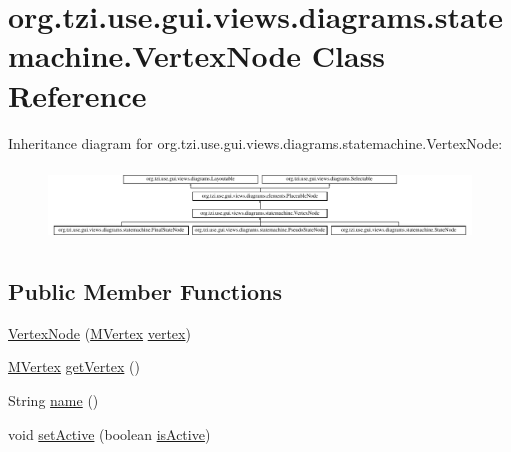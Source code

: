\hypertarget{classorg_1_1tzi_1_1use_1_1gui_1_1views_1_1diagrams_1_1statemachine_1_1_vertex_node}{\section{org.\-tzi.\-use.\-gui.\-views.\-diagrams.\-statemachine.\-Vertex\-Node Class Reference}
\label{classorg_1_1tzi_1_1use_1_1gui_1_1views_1_1diagrams_1_1statemachine_1_1_vertex_node}
}
Inheritance diagram for org.\-tzi.\-use.\-gui.\-views.\-diagrams.\-statemachine.\-Vertex\-Node\-:\begin{figure}[H]
\begin{center}
\leavevmode
\includegraphics[height=2.007169cm]{classorg_1_1tzi_1_1use_1_1gui_1_1views_1_1diagrams_1_1statemachine_1_1_vertex_node}
\end{center}
\end{figure}
\subsection*{Public Member Functions}
\begin{DoxyCompactItemize}
\item 
\hyperlink{classorg_1_1tzi_1_1use_1_1gui_1_1views_1_1diagrams_1_1statemachine_1_1_vertex_node_a2e0d79f06a37c970dd05ab9fc585c262}{Vertex\-Node} (\hyperlink{classorg_1_1tzi_1_1use_1_1uml_1_1mm_1_1statemachines_1_1_m_vertex}{M\-Vertex} \hyperlink{classorg_1_1tzi_1_1use_1_1gui_1_1views_1_1diagrams_1_1statemachine_1_1_vertex_node_a9475b226ad0fa74ddbbc6217874a867e}{vertex})
\item 
\hyperlink{classorg_1_1tzi_1_1use_1_1uml_1_1mm_1_1statemachines_1_1_m_vertex}{M\-Vertex} \hyperlink{classorg_1_1tzi_1_1use_1_1gui_1_1views_1_1diagrams_1_1statemachine_1_1_vertex_node_ae0b110dc35b4617d8a982d6b22b2f0b8}{get\-Vertex} ()
\item 
String \hyperlink{classorg_1_1tzi_1_1use_1_1gui_1_1views_1_1diagrams_1_1statemachine_1_1_vertex_node_ac6721e0ca6ea25feb7db829f44737187}{name} ()
\item 
void \hyperlink{classorg_1_1tzi_1_1use_1_1gui_1_1views_1_1diagrams_1_1statemachine_1_1_vertex_node_a070816233e6f9f44b7be093e2752a741}{set\-Active} (boolean \hyperlink{classorg_1_1tzi_1_1use_1_1gui_1_1views_1_1diagrams_1_1statemachine_1_1_vertex_node_acaa568b472e612892880ae3c19546509}{is\-Active})
\end{DoxyCompactItemize}

